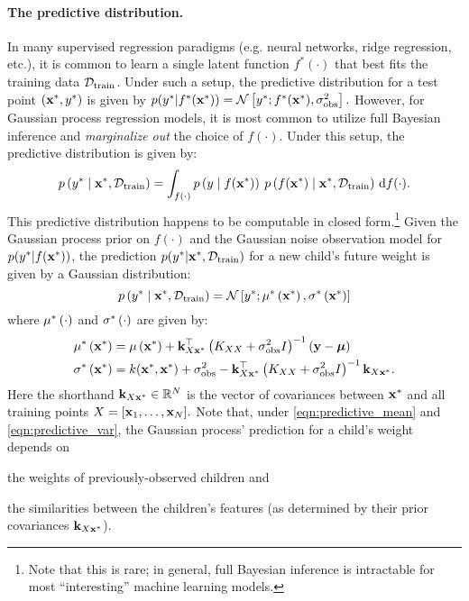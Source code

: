 \paragraph{The predictive distribution.}
In many supervised regression paradigms (e.g. neural networks, ridge regression, etc.), it is common to learn a single latent function $f^*(\cdot)$ that best fits the training data $\mathcal D_\text{train}$.
Under such a setup, the predictive distribution for a test point $(\mathbf{x}^*, y^*)$ is given by
$ p(y^* \vert f^*(\mathbf{x}^*)) = \mathcal{N} \left[  y^*; f^*(\mathbf{x}^*) ,  \sigma^2_\text{obs}  \right]. $
However, for Gaussian process regression models, it is most common to utilize full Bayesian inference and \emph{marginalize out} the choice of $f(\cdot)$.
Under this setup, the predictive distribution is given by:
\begin{equation*}
  p \left( y^* \mid \mathbf{x}^*, \mathcal D_\text{train} \right)
  = \int_{f(\cdot)} p\left( y \mid f(\mathbf{x}^*) \right) \: p\left( f(\mathbf{x}^*) \mid \mathbf{x}^*, \mathcal D_\text{train} \right)
  \,\mathrm{d}{f}(\cdot).
\end{equation*}
%
This predictive distribution happens to be computable in closed form.\footnote{
  Note that this is rare; in general, full Bayesian inference is intractable for most ``interesting'' machine learning models.
}
Given the Gaussian process prior on $f(\cdot)$ and the Gaussian noise observation model for $p(y^* \vert f(\mathbf{x}^*))$, the prediction $p(y^* \vert \mathbf{x}^*, \mathcal D_\text{train})$ for a new child's future weight is given by a Gaussian distribution:
%
\begin{equation}
  p \left(
    y^* \mid \mathbf{x}^*, \mathcal D_\text{train}
  \right)
  = \mathcal{N} \left[  y^* ; \mu^* \left( \mathbf{x}^* \right),  \sigma^* \left( \mathbf{x}^* \right)  \right]
  \label{eqn:predictive}
\end{equation}
%
where $\mu^* \left( \cdot \right)$ and $\sigma^* \left( \cdot \right)$ are given by:
%
\begin{align}
  \mu^* \left( \mathbf{x}^* \right)
  &= \mu\left( \mathbf{x}^* \right) + \mathbf{k}_{X \mathbf{x}^*}^\top \left( K_{XX} + \sigma_\text{obs}^2 I \right)^{-1} \left( \mathbf{y} - \boldsymbol{\mu} \right)
  \label{eqn:predictive_mean}
  \\
  \sigma^* \left( \mathbf{x}^* \right)
  &= k ( \mathbf{x}^*, \mathbf{x}^*) + \sigma^2_\text{obs} - \mathbf{k}_{X \mathbf{x}^*}^\top \left( K_{XX} + \sigma_\text{obs}^2 I \right)^{-1} \mathbf{k}_{X \mathbf{x}^*}.
  \label{eqn:predictive_var}
\end{align}
%
Here the shorthand $\mathbf{k}_{X \mathbf{x}^*} \in \mathbb{R}^N$ is the vector of covariances between $\mathbf{x}^*$ and all training points $X = [\mathbf{x}_1, \ldots, \mathbf{x}_N].$
Note that, under \autoref{eqn:predictive_mean} and \autoref{eqn:predictive_var}, the Gaussian process' prediction for a child's weight depends on
\begin{enumerate*}
  \item the weights of previously-observed children and
  \item the similarities between the children's features (as determined by their prior covariances $\mathbf{k}_{X \mathbf{x}^*}$).
\end{enumerate*}

